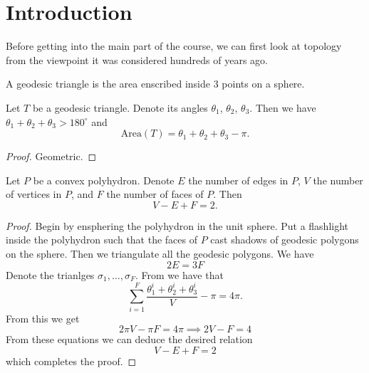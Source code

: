 \documentclass[11pt,a4paper]{article}
\begin{document}
\maketitle


\newpage
\tableofcontents
\newpage

\setcounter{section}{-1}

\section{Introduction}

Before getting into the main part of the course, we can first look
at topology from the viewpoint it was considered hundreds of years ago.

\begin{definition}
  A geodesic triangle is the area enscribed inside $3$ points
  on a sphere.
\end{definition}

\begin{theorem}
  \label{thm:girard}
  Let $T$ be a geodesic triangle.
  Denote its angles $\theta_1$, $\theta_2$, $\theta_3$.
  Then we have $\theta_1 + \theta_2 + \theta_3 > 180^{\circ}$ and
  \[
    \mathrm{Area}(T) = \theta_1 + \theta_2 + \theta_3 - \pi.
  \]
\end{theorem}
\begin{proof}
  Geometric.
\end{proof}

\begin{theorem}
  \label{thm:euler}
  Let $P$ be a convex polyhydron.
  Denote $E$ the number of edges in $P$, $V$ the number of vertices in $P$,
  and $F$ the number of faces of $P$.
  Then
  \[
    V - E + F = 2.
  \]
\end{theorem}
\begin{proof}
  Begin by ensphering the polyhydron in the unit sphere.
  Put a flashlight inside the polyhydron such that the faces of $P$
  cast shadows of geodesic polygons on the sphere.
  Then we triangulate all the geodesic polygons.
  We have
  \[
    \boxed{2 E = 3 F}
  \]
  Denote the trianlges $\sigma_1,\dots,\sigma_F$.
  From  we have that
  \[
    \sum_{i=1}^{F} \frac{\theta_1^i + \theta_2^i + \theta_3^i}{V} - \pi =
    4 \pi.
  \]
  From this we get
  \[
    2 \pi V - \pi F = 4 \pi \implies
    \boxed{2 V - F = 4}
  \]
  From these equations we can deduce the desired relation
  \[
    \boxed{V - E + F = 2}
  \]
  which completes the proof.
\end{proof}
\end{document}

